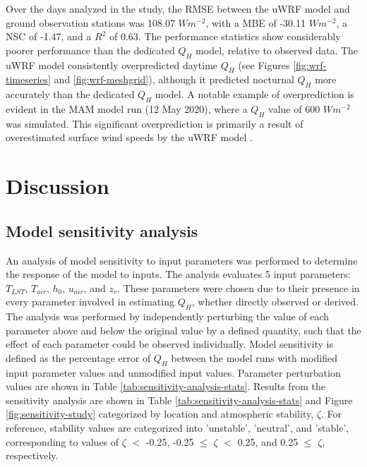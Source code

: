 Over the days analyzed in the study, the RMSE between the uWRF model and ground observation stations was 108.07 $W m^{-2}$, with a MBE of -30.11 $W m^{-2}$, a NSC of -1.47, and a $R^2$ of 0.63. The performance statistics show considerably poorer performance than the dedicated $Q_H$ model, relative to observed data. The uWRF model consistently overpredicted daytime $Q_H$ (see Figures \ref{fig:wrf-timeseries} and \ref{fig:wrf-meshgrid}), although it predicted nocturnal $Q_H$ more accurately than the dedicated $Q_H$ model. A notable example of overprediction is evident in the MAM model run (12 May 2020), where a $Q_H$ value of 600 $W m^{-2}$ was simulated. This significant overprediction is primarily a result of overestimated surface wind speeds by the uWRF model \citep{Bauer_2020}. \FloatBarrier


\section{Discussion}

\FloatBarrier

\subsection{Model sensitivity analysis}

An analysis of model sensitivity to input parameters was performed to determine the response of the model to inputs. The analysis evaluates 5 input parameters: $T_{LST}$, $T_{air}$, $h_0$, $u_{air}$, and $z_r$. These parameters were chosen due to their presence in every parameter involved in estimating $Q_H$, whether directly observed or derived. The analysis was performed by independently perturbing the value of each parameter above and below the original value by a defined quantity, such that the effect of each parameter could be observed individually. Model sensitivity is defined as the percentage error of $Q_H$ between the model runs with modified input parameter values and unmodified input values. Parameter perturbation values are shown in Table \ref{tab:sensitivity-analysis-stats}. Results from the sensitivity analysis are shown in Table \ref{tab:sensitivity-analysis-stats} and Figure \ref{fig:sensitivity-study} categorized by location and atmospheric stability, $\zeta$. For reference, stability values are categorized into 'unstable', 'neutral', and 'stable', corresponding to values of $\zeta$ $<$ -0.25, -0.25 $\leq$ $\zeta$ $<$ 0.25, and 0.25 $\leq$ $\zeta$, respectively.

